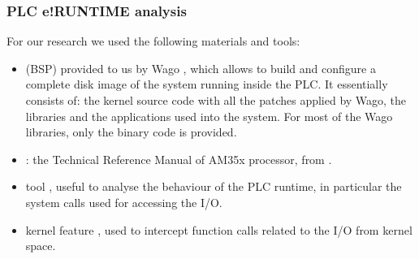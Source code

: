 \subsubsection{PLC e!RUNTIME analysis}

For our research we used the following materials and tools:
\begin{itemize}
	\item {} (BSP) provided to us by Wago \cite{wago_linux}, which allows to build and configure a complete disk image
	of the system running inside the PLC. It essentially consists of: the kernel source code with all the patches applied by Wago, the libraries and
	the applications used into the system. For most of the Wago libraries, only the binary code is provided.
	\item {}: the Technical Reference Manual of AM35x processor, from \cite{am35x}.
	\item {} tool \cite{strace}, useful to analyse the behaviour of the PLC runtime, in particular the system calls used for accessing the I/O.
	\item {} kernel feature \cite{kprobes}, used to intercept function calls related to the I/O from kernel space.
\end{itemize}

